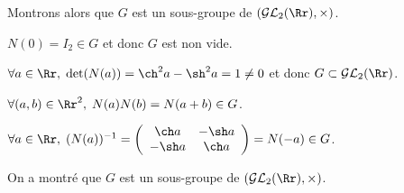 {{Montrons alors que $G$ est un sous-groupe de $(\mathcal{GL}_2(\Rr),\times)$.

$N(0)=I_2\in G$ et donc $G$ est non vide.

$\forall a\in\Rr,\;\mbox{det}(N(a))=\ch^2a-\sh^2a=1\neq0$ et donc $G\subset\mathcal{GL}_2(\Rr)$.

$\forall(a,b)\in\Rr^2,\;N(a)N(b)=N(a+b)\in G$.

$\forall a\in\Rr,\;(N(a))^{-1}=\left(
\begin{array}{cc}
\ch a&-\sh a\\
-\sh a&\ch a
\end{array}
\right)=N(-a)\in G$.

On a montré que $G$ est un sous-groupe de $(\mathcal{GL}_2(\Rr),\times)$.
}
}
